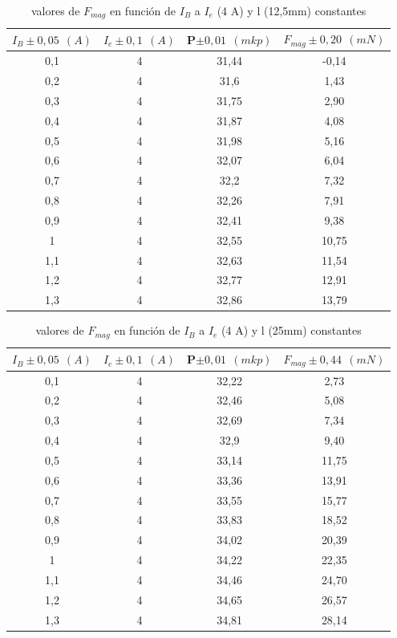 \documentclass[12pt,a4paper]{book}
\begin{document}
\begin{table}[h!]
\begin{center}
\begin{tabular}{|c|c|c|c|}
\hline
$I_B  \pm 0,05 \ \  (A)$ & 	 $I_e \pm 0,1 \ \ (A) $ & 	 P$\pm 0,01\ \ (mkp)$ & 	 $F_{mag} \pm 0,20 \ \ (mN)$ \\ \hline
0,1 & 	 4 & 	 31,44 & 	 -0,14 \\
0,2 & 	 4 & 	 31,6 & 	 1,43 \\
0,3 & 	 4 & 	 31,75 & 	 2,90 \\
0,4 & 	 4 & 	 31,87 & 	 4,08 \\
0,5 & 	 4 & 	 31,98 & 	 5,16 \\
0,6 & 	 4 & 	 32,07 & 	 6,04 \\
0,7 & 	 4 & 	 32,2 & 	 7,32 \\
0,8 & 	 4 & 	 32,26 & 	 7,91 \\
0,9 & 	 4 & 	 32,41 & 	 9,38 \\
1 & 	 4 & 	 32,55 & 	 10,75 \\
1,1 & 	 4 & 	 32,63 & 	 11,54 \\
1,2 & 	 4 & 	 32,77 & 	 12,91 \\
1,3 & 	 4 & 	 32,86 & 	 13,79 \\
\hline
\end{tabular}
\label{Tab: Fmag vs IB a l=12,5mm balanza}
\caption{valores de $F_{mag}$ en función de $I_B$ a $I_e$ (4 A) y l (12,5mm) constantes }
\end{center}
\end{table}


\begin{table}[h!]
\begin{center}
\begin{tabular}{|c|c|c|c|}
\hline
$I_B  \pm 0,05 \ \  (A)$ & 	 $I_e \pm 0,1 \ \ (A) $ & 	 P$\pm 0,01\ \ (mkp)$ & 	 $F_{mag} \pm 0,44 \ \ (mN)$ \\ \hline
0,1 & 	 4 & 	 32,22 & 	 2,73 \\
0,2 & 	 4 & 	 32,46 & 	 5,08 \\
0,3 & 	 4 & 	 32,69 & 	 7,34 \\
0,4 & 	 4 & 	 32,9 & 	 9,40 \\
0,5 & 	 4 & 	 33,14 & 	 11,75 \\
0,6 & 	 4 & 	 33,36 & 	 13,91 \\
0,7 & 	 4 & 	 33,55 & 	 15,77 \\
0,8 & 	 4 & 	 33,83 & 	 18,52 \\
0,9 & 	 4 & 	 34,02 & 	 20,39 \\
1 & 	 4 & 	 34,22 & 	 22,35 \\
1,1 & 	 4 & 	 34,46 & 	 24,70 \\
1,2 & 	 4 & 	 34,65 & 	 26,57 \\
1,3 & 	 4 & 	 34,81 & 	 28,14 \\
\hline
\end{tabular}
\label{Tab: Fmag vs IB a l=25mm balanza}
\caption{valores de $F_{mag}$ en función de $I_B$ a $I_e$ (4 A) y l (25mm) constantes }
\end{center}
\end{table}
\end{document}
